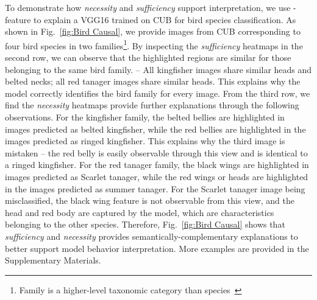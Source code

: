 To demonstrate how \textit{necessity} and \textit{sufficiency} support interpretation, we use \name{}-feature to explain a VGG16 trained on CUB for bird species classification.
As shown in Fig.~\ref{fig:Bird Causal}, we provide images from CUB corresponding to four bird species in two families\footnote{Family is a higher-level taxonomic category than species~\cite{enwiki:1116635228}}.
By inspecting the \textit{sufficiency} heatmaps in the second row, we can observe that the highlighted regions are similar for those belonging to the same bird family. -- All {\selectfont kingfisher} images share similar heads and belted necks; all {\selectfont red tanager} images share similar heads.
This explains why the model correctly identifies the bird family for every image.
From the third row, we find the \textit{necessity} heatmaps provide further explanations through the following observations.
For the {\selectfont kingfisher} family, the belted bellies are highlighted in images predicted as {\selectfont belted kingfisher}, while the red bellies are highlighted in the images predicted as {\selectfont ringed kingfisher}.
This explains why the third image is mistaken -- the red belly is easily observable through this view and is identical to a {\selectfont ringed kingfisher}.
For the {\selectfont red tanager} family, the black wings are highlighted in images predicted as {\selectfont Scarlet tanager}, while the red wings or heads are highlighted in the images predicted as {\selectfont summer tanager}. For the {\selectfont Scarlet tanager} image being misclassified, the black wing feature is not observable from this view, and the head and red body are captured by the model, which are characteristics belonging to the other species.
Therefore, Fig.~\ref{fig:Bird Causal} shows that \textit{sufficiency} and \textit{necessity} provides semantically-complementary explanations to better support model behavior interpretation.
More examples are provided in the Supplementary Materials.

